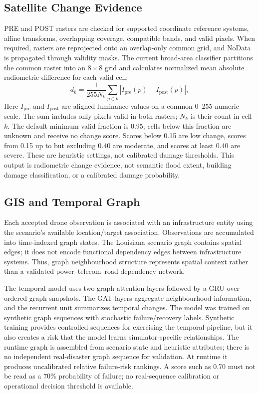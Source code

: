 \documentclass[conference]{IEEEtran}
\newcommand{\changed}[1]{{\color{blue}#1}}
\newcommand{\changed}[1]{#1}
\begin{document}
\subsection{Satellite Change Evidence}
PRE and POST rasters are checked for supported coordinate reference systems, affine transforms, overlapping coverage, compatible bands, and valid pixels. When required, rasters are reprojected onto an overlap-only common grid, and NoData is propagated through validity masks. The current broad-area classifier partitions the common raster into an $8\times8$ grid and calculates normalized mean absolute radiometric difference for each valid cell:
\begin{equation}
 d_k=\frac{1}{255N_k}\sum_{p\in k}\left|I_{\mathrm{pre}}(p)-I_{\mathrm{post}}(p)\right|,
\end{equation}
\changed{Here $I_{\mathrm{pre}}$ and $I_{\mathrm{post}}$ are aligned luminance values on a common 0--255 numeric scale. The sum includes only pixels valid in both rasters; $N_k$ is their count in cell $k$. The default minimum valid fraction is 0.95; cells below this fraction are unknown and receive no change score. Scores below 0.15 are low change, scores from 0.15 up to but excluding 0.40 are moderate, and scores at least 0.40 are severe. These are heuristic settings, not calibrated damage thresholds.} This output is radiometric change evidence, not semantic flood extent, building damage classification, or a calibrated damage probability.

\subsection{GIS and Temporal Graph}
Each accepted drone observation is associated with an infrastructure entity using the scenario's available location/target association. Observations are accumulated into time-indexed graph states. The Louisiana scenario graph contains spatial edges; it does not encode functional dependency edges between infrastructure systems. Thus, graph neighbourhood structure represents spatial context rather than a validated power--telecom--road dependency network.

The temporal model uses two graph-attention layers followed by a GRU over ordered graph snapshots. The GAT layers aggregate neighbourhood information, and the recurrent unit summarizes temporal changes. The model was trained on synthetic graph sequences with stochastic failure/recovery labels. Synthetic training provides controlled sequences for exercising the temporal pipeline, but it also creates a risk that the model learns simulator-specific relationships. The runtime graph is assembled from scenario state and heuristic attributes; there is no independent real-disaster graph sequence for validation. At runtime it produces uncalibrated relative failure-risk rankings. A score such as 0.70 must not be read as a 70\% probability of failure; no real-sequence calibration or operational decision threshold is available.
\end{document}
